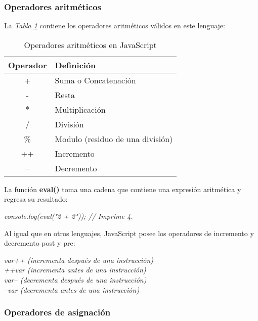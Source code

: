 \subsubsection{Operadores aritméticos}

La \textit{Tabla \ref{tab: 2}} contiene los operadores aritméticos válidos en este lenguaje:
\begin{table}[H]
    \begin{center}
        \caption{Operadores aritméticos en JavaScript}
        \label{tab: 2}
        \begin{tabular}{c l}
            \hline
            \textbf{Operador}&\textbf{Definición} \\
            \hline
            + & Suma o Concatenación \\
            - & Resta \\
            $\ast$ & Multiplicación \\
            / & División \\
            \% & Modulo (residuo de una división) \\
            ++ & Incremento \\
            -- & Decremento \\
            \hline
        \end{tabular}
    \end{center}
\end{table}

La función \textbf{eval()} toma una cadena que contiene una expresión aritmética y regresa su resultado:
\begin{center}
    \textit{console.log(eval("2 + 2")); // Imprime 4.}
\end{center}

Al igual que en otros lenguajes, JavaScript posee los operadores de incremento y decremento post y pre:
\begin{center}
    \textit{
            var++ (incrementa después de una instrucción) \\
            ++var (incrementa antes de una instrucción) \\
            var-- (decrementa después de una instrucción) \\
            --var (decrementa antes de una instrucción) \\
    }
\end{center}


\subsubsection{Operadores de asignación}

